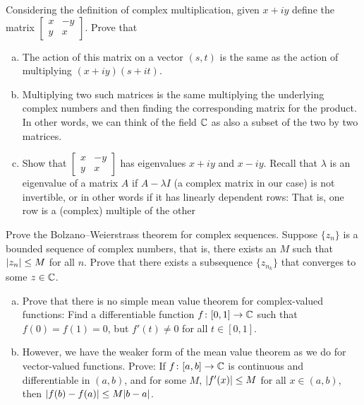 \begin{samepage}
\begin{exercise}
Considering the definition of complex multiplication, given $x +iy$
define the matrix
$\left[ \begin{smallmatrix} x & -y \\ y & x \end{smallmatrix} \right]$.
Prove that
\begin{enumerate}[a)]
\item
The action of this matrix on a vector $(s,t)$ is the same
as the action of multiplying $(x+iy)(s+it)$.
\item
Multiplying two such matrices is the same multiplying the underlying complex
numbers and then finding the corresponding matrix for the product.
In other words, we can think of the field ${\mathbb{C}}$ as also a subset of
the two by two matrices.
\item
Show that 
$\left[ \begin{smallmatrix} x & -y \\ y & x \end{smallmatrix} \right]$
has eigenvalues $x+iy$ and $x-iy$.  Recall that $\lambda$ is
an eigenvalue of a matrix $A$ if $A-\lambda I$ (a complex matrix in our case)
is not invertible, or in other words
if it has linearly dependent rows: That is, one row is a (complex) multiple
of the other
\end{enumerate}
\end{exercise}
\end{samepage}

\begin{exercise}
Prove the Bolzano--Weierstrass theorem for complex sequences.
Suppose $\{ z_n \}$ is a bounded sequence of complex numbers, that
is, there exists an $M$ such that $\lvert {z_n} \rvert \leq M$ for all $n$.  Prove
that there exists a subsequence $\{ z_{n_k} \}$ that converges to some $z
\in {\mathbb{C}}$.
\end{exercise}

\begin{exercise}
\leavevmode
\begin{enumerate}[a)]
\item
Prove that there is no simple mean value theorem for complex-valued
functions:  Find a differentiable function $f \colon [0,1] \to {\mathbb{C}}$ such that
$f(0) = f(1) = 0$, but $f'(t) \not= 0$ for all $t \in [0,1]$.
\item
However, we have the weaker form of the mean value theorem as we do for vector-valued
functions.  Prove: If $f \colon [a,b] \to {\mathbb{C}}$ is continuous and differentiable in
$(a,b)$, and for some $M$, $\lvert {f'(x)} \rvert \leq M$ for all $x \in (a,b)$, then
$\lvert {f(b)-f(a)} \rvert \leq M \lvert {b-a} \rvert$.
\end{enumerate}
\end{exercise}

